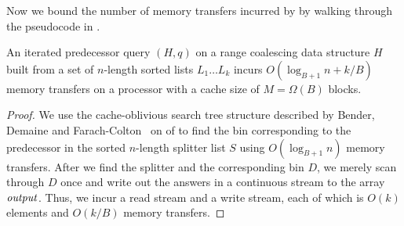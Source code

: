Now we bound the number of memory transfers incurred by  by walking 
through the pseudocode in .

\begin{theorem}
An iterated predecessor query $(H,q)$ on a range coalescing data 
structure $H$ built from a set of $n$-length sorted lists $L_1 \ldots L_k$ 
incurs $O(\log_{B+1} n + k/B)$ memory transfers on a processor with a cache 
size of $M = \Omega(B)$ blocks.
\end{theorem}
\begin{proof}
We use the cache-oblivious search tree structure described by Bender, 
Demaine and Farach-Colton~\cite{BenderDeFa00} on  of 
 to find the bin corresponding to the predecessor in the 
sorted $n$-length splitter list $S$ using $O(\log_{B+1}n)$ memory transfers.
After we find the splitter and the corresponding bin $D$, we merely scan through
$D$ once and write out the answers in a continuous stream to the array $\id{output}$.
Thus, we incur a read stream and a write stream, each of which is $O(k)$ elements
and $O(k/B)$ memory transfers.
\end{proof}


